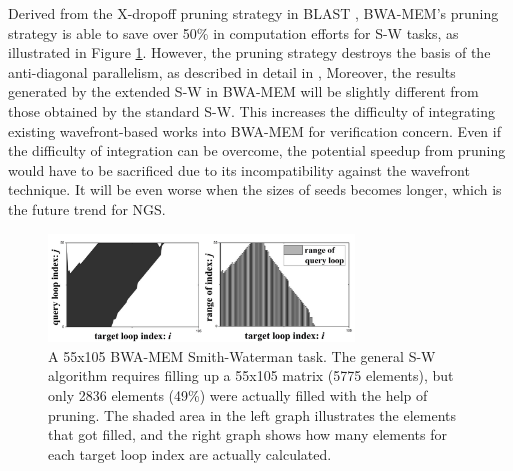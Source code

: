 Derived from the X-dropoff pruning strategy in BLAST \cite{BLAST1990}, 
BWA-MEM's pruning strategy is able to save over 50\% in computation efforts for S-W tasks, as illustrated in Figure \ref{fig:F2C2}. 
However, the pruning strategy destroys the basis of the anti-diagonal parallelism, as described in detail in \cite{BWA-MEM}, 
Moreover, the results generated by the extended S-W in BWA-MEM will be slightly different from those obtained by the standard S-W. 
This increases the difficulty of integrating existing wavefront-based works into BWA-MEM for verification concern. 
Even if the difficulty of integration can be overcome, 
the potential speedup from pruning would have to be sacrificed due to its incompatibility against the wavefront technique.
It will be even worse when the sizes of seeds becomes longer, which is the future trend for NGS.
\begin{figure}[!hbt]
	\begin{center}
		\includegraphics[width=3.2in]{Figures/Figure2C2.jpg}
		\caption {A 55x105 BWA-MEM Smith-Waterman task. The general S-W algorithm requires filling up a 55x105 matrix (5775 elements), but only 2836 elements (49\%) were actually filled with the help of pruning. The shaded area in the left graph illustrates the elements that got filled, and the right graph shows how many elements for each target loop index are actually calculated.}
		\label{fig:F2C2}
	\end{center}
\end{figure}


